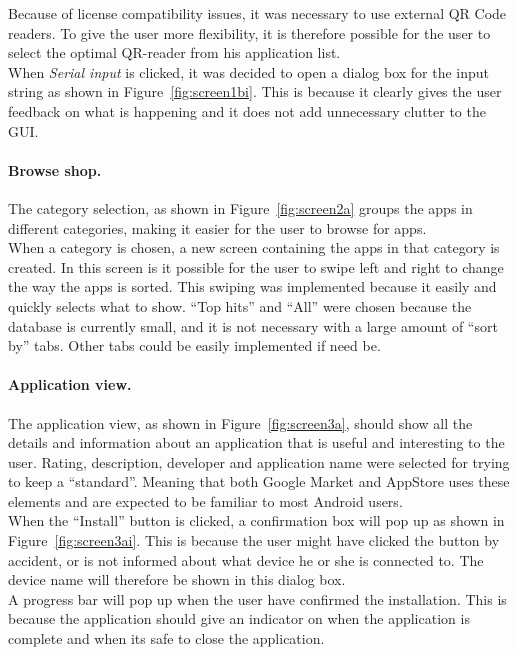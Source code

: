 	Because of license compatibility issues, it was necessary to use external QR Code readers. To give the user more flexibility, it is therefore possible for the user to select the optimal QR-reader from his application list.\\

	When \textit{Serial input} is clicked, it was decided to open a dialog box for the input string as shown in Figure~\ref{fig:screen1bi}. This is because it clearly gives the user feedback on what is happening and it does not add unnecessary clutter to the GUI.

	\paragraph{Browse shop.}
	The category selection, as shown in Figure~\ref{fig:screen2a} groups the apps in different categories, making it easier for the user to browse for apps. \\

	When a category is chosen, a new screen containing the apps in that category is created. In this screen is it possible for the user to swipe left and right to change the way the apps is sorted. This swiping was implemented because it easily and quickly selects what to show. ``Top hits'' and ``All'' were chosen because the database is currently small, and it is not necessary with a large amount of ``sort by'' tabs. Other tabs could be easily implemented if need be.

	\paragraph{Application view.}
	The application view, as shown in Figure~\ref{fig:screen3a}, should show all the details and information about an application that is useful and interesting to the user. Rating, description, developer and application name were selected for trying to keep a ``standard''. Meaning that both Google Market and AppStore uses these elements and are expected to be familiar to most Android users.\\

	When the ``Install'' button is clicked, a confirmation box will pop up as shown in Figure~\ref{fig:screen3ai}. This is because the user might have clicked the button by accident, or is not informed about what device he or she is connected to. The device name will therefore be shown in this dialog box.\\

	A progress bar will pop up when the user have confirmed the installation. This is because the application should give an indicator on when the application is complete and when its safe to close the application.

